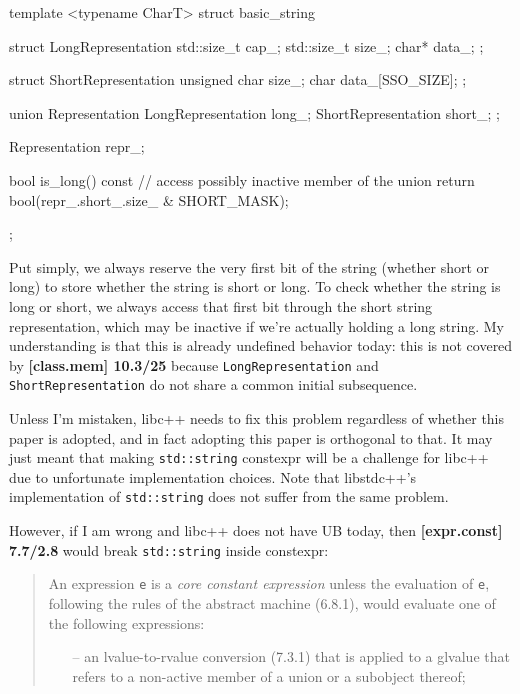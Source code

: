 \documentclass{wg21}
\newcommand{\cc}[1]{\texttt{#1}}
\begin{document}
\begin{cpp}
template <typename CharT>
struct basic_string {
  struct LongRepresentation {
    std::size_t cap_;
    std::size_t size_;
    char* data_;
  };

  struct ShortRepresentation {
    unsigned char size_;
    char data_[SSO_SIZE];
  };

  union Representation {
    LongRepresentation long_;
    ShortRepresentation short_;
  };

  Representation repr_;

  bool is_long() const {
    // access possibly inactive member of the union
    return bool(repr_.short_.size_ & SHORT_MASK);
  }
};
\end{cpp}

Put simply, we always reserve the very first bit of the string (whether short
or long) to store whether the string is short or long. To check whether the
string is long or short, we always access that first bit through the short
string representation, which may be inactive if we're actually holding a long
string. My understanding is that this is already undefined behavior today: this
is not covered by \textbf{[class.mem] 10.3/25} because \cc{LongRepresentation}
and \cc{ShortRepresentation} do not share a common initial subsequence.

Unless I'm mistaken, libc++ needs to fix this problem regardless of whether
this paper is adopted, and in fact adopting this paper is orthogonal to that.
It may just meant that making \cc{std::string} constexpr will be a challenge
for libc++ due to unfortunate implementation choices. Note that libstdc++'s
implementation of \cc{std::string} does not suffer from the same problem.

However, if I am wrong and libc++ does not have UB today, then
\textbf{[expr.const] 7.7/2.8} would break \cc{std::string} inside
constexpr:

\begin{quote}
An expression \texttt{e} is a \textit{core constant expression} unless the
evaluation of \texttt{e}, following the rules of the abstract machine (6.8.1),
would evaluate one of the following expressions:

\begin{itemize}
  \item [--] an lvalue-to-rvalue conversion (7.3.1) that is applied to a glvalue
             that refers to a non-active member of a union or a subobject thereof;
\end{itemize}
\end{quote}
\end{document}

